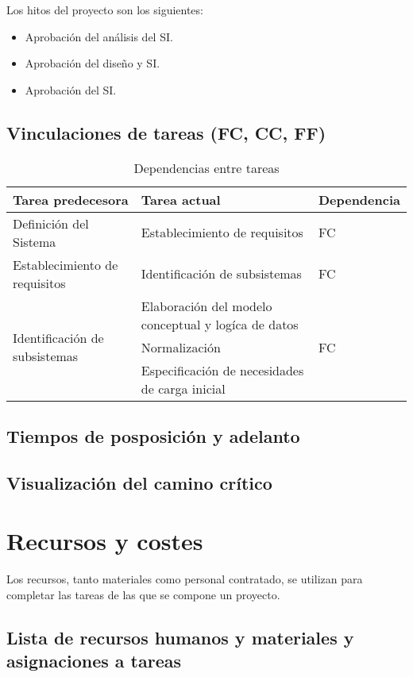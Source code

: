 \documentclass[11pt,a4paper,spanish,twoside]{report}
\begin{document}
Los hitos del proyecto son los siguientes:
\begin{itemize}
\item Aprobación del análisis del SI.
\item Aprobación del diseño y SI.
\item Aprobación del SI.
\end{itemize}

\section{Vinculaciones de tareas (FC, CC, FF)}
\begin{table}[!h]
\centering
\small
  \begin{tabular}{l|p{5cm}|l}
    \textbf{Tarea predecesora} & \textbf{Tarea actual} & \textbf{Dependencia} \\
    \hline \hline
    Definición del Sistema & Establecimiento de requisitos & FC \\
    \hline
    Establecimiento de requisitos & Identificación de subsistemas & FC \\
    \hline
    \multirow{3}{*}{Identificación de subsistemas} & Elaboración del modelo conceptual y logíca de datos & \multirow{3}{*}{FC} \\
    & Normalización \\
    & Especificación de necesidades de carga inicial \\
    
    
  \end{tabular}
  \caption{Dependencias entre tareas} \label{Tab:Dep}
\end{table}

\section{Tiempos de posposición y adelanto}

\section{Visualización del camino crítico}

\chapter{Recursos y costes}
Los recursos, tanto materiales como personal contratado, se utilizan para
completar las tareas de las que se compone un proyecto. 


\section{Lista de recursos humanos y materiales y asignaciones a 
  tareas}
\end{document}
